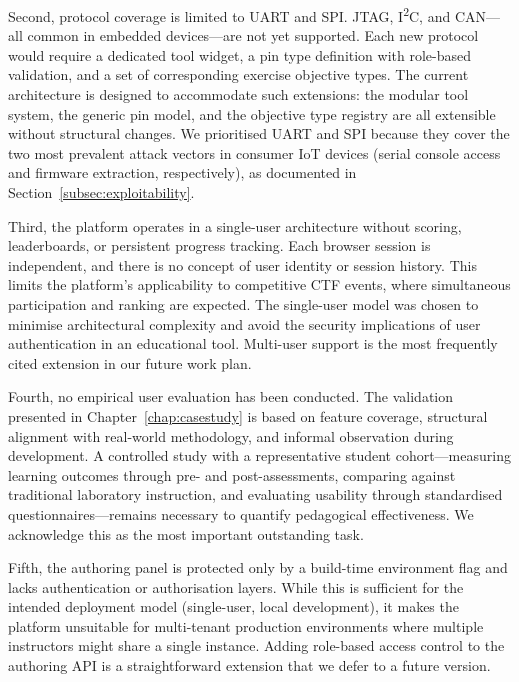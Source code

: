 Second, protocol coverage is limited to UART and SPI. JTAG, I\textsuperscript{2}C, and CAN---all common in embedded devices---are not yet supported. Each new protocol would require a dedicated tool widget, a pin type definition with role-based validation, and a set of corresponding exercise objective types. The current architecture is designed to accommodate such extensions: the modular tool system, the generic pin model, and the objective type registry are all extensible without structural changes. We prioritised UART and SPI because they cover the two most prevalent attack vectors in consumer IoT devices (serial console access and firmware extraction, respectively), as documented in Section~\ref{subsec:exploitability}.

Third, the platform operates in a single-user architecture without scoring, leaderboards, or persistent progress tracking. Each browser session is independent, and there is no concept of user identity or session history. This limits the platform's applicability to competitive CTF events, where simultaneous participation and ranking are expected. The single-user model was chosen to minimise architectural complexity and avoid the security implications of user authentication in an educational tool. Multi-user support is the most frequently cited extension in our future work plan.

Fourth, no empirical user evaluation has been conducted. The validation presented in Chapter~\ref{chap:casestudy} is based on feature coverage, structural alignment with real-world methodology, and informal observation during development. A controlled study with a representative student cohort---measuring learning outcomes through pre- and post-assessments, comparing against traditional laboratory instruction, and evaluating usability through standardised questionnaires---remains necessary to quantify pedagogical effectiveness. We acknowledge this as the most important outstanding task.

Fifth, the authoring panel is protected only by a build-time environment flag and lacks authentication or authorisation layers. While this is sufficient for the intended deployment model (single-user, local development), it makes the platform unsuitable for multi-tenant production environments where multiple instructors might share a single instance. Adding role-based access control to the authoring API is a straightforward extension that we defer to a future version.

